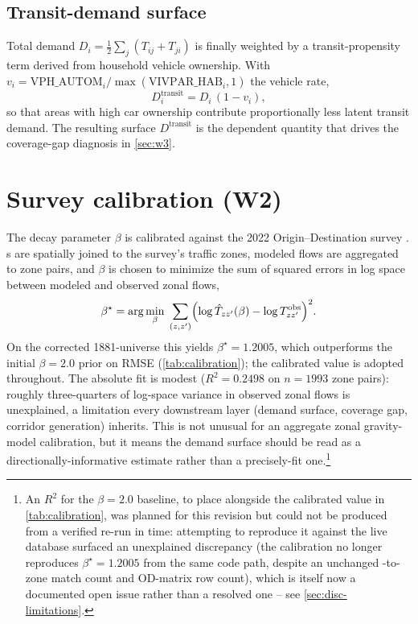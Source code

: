 \subsection{Transit-demand surface}
Total \ageb demand $D_i = \tfrac12\sum_j (T_{ij}+T_{ji})$ is finally weighted by a
transit-propensity term derived from household vehicle ownership. With
$v_i = \mathrm{VPH\_AUTOM}_i / \max(\mathrm{VIVPAR\_HAB}_i, 1)$ the vehicle rate,
\begin{equation}
  D^{\text{transit}}_i = D_i \,(1 - v_i),
  \label{eq:transit-demand}
\end{equation}
so that areas with high car ownership contribute proportionally less latent transit
demand. The resulting surface $D^{\text{transit}}$ is the dependent quantity that
drives the coverage-gap diagnosis in \cref{sec:w3}.

\section{Survey calibration (W2)}
\label{sec:w2}

The decay parameter $\beta$ is calibrated against the 2022 Origin--Destination
survey \parencite{imeplan_eod2022}. \ageb{}s are spatially joined to the survey's
traffic zones, modeled flows are aggregated to zone pairs, and $\beta$ is chosen to
minimize the sum of squared errors in log space between modeled and observed zonal
flows,
\begin{equation}
  \beta^\star = \arg\min_{\beta}\;
  \sum_{(z,z')} \Bigl(\log \hat{T}_{zz'}(\beta) - \log T^{\text{obs}}_{zz'}\Bigr)^2 .
  \label{eq:calibration}
\end{equation}
On the corrected \num{1881}-\ageb universe this yields $\beta^\star = \num{1.2005}$,
which outperforms the initial $\beta = \num{2.0}$ prior on RMSE (\cref{tab:calibration});
the calibrated value is adopted throughout. The absolute fit is modest
($R^2 = \num{0.2498}$ on $n=\num{1993}$ zone pairs): roughly three-quarters of log-space
variance in observed zonal flows is unexplained, a limitation every downstream layer
(demand surface, coverage gap, corridor generation) inherits. This is not unusual for an
aggregate zonal gravity-model calibration, but it means the demand surface should be read
as a directionally-informative estimate rather than a precisely-fit one.\footnote{An $R^2$
for the $\beta=2.0$ baseline, to place alongside the calibrated value in
\cref{tab:calibration}, was planned for this revision but could not be produced from a
verified re-run in time: attempting to reproduce it against the live database surfaced an
unexplained discrepancy (the calibration no longer reproduces $\beta^\star=1.2005$ from the
same code path, despite an unchanged \ageb-to-zone match count and OD-matrix row count),
which is itself now a documented open issue rather than a resolved one -- see
\cref{sec:disc-limitations}.}

